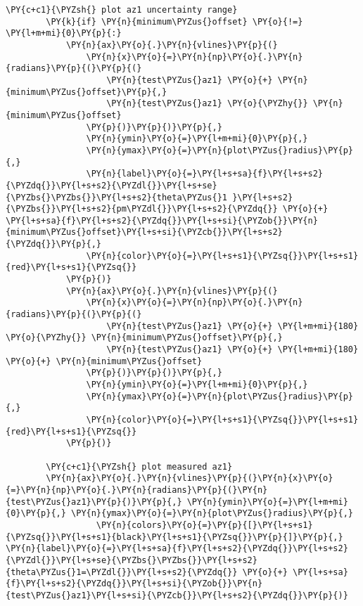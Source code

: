 \begin{tcolorbox}[breakable, size=fbox, boxrule=1pt, pad at break*=1mm,colback=cellbackground, colframe=cellborder]
\begin{Verbatim}[commandchars=\\\{\}]
        \PY{c+c1}{\PYZsh{} plot az1 uncertainty range}
        \PY{k}{if} \PY{n}{minimum\PYZus{}offset} \PY{o}{!=} \PY{l+m+mi}{0}\PY{p}{:}
            \PY{n}{ax}\PY{o}{.}\PY{n}{vlines}\PY{p}{(}
                \PY{n}{x}\PY{o}{=}\PY{n}{np}\PY{o}{.}\PY{n}{radians}\PY{p}{(}\PY{p}{(}
                    \PY{n}{test\PYZus{}az1} \PY{o}{+} \PY{n}{minimum\PYZus{}offset}\PY{p}{,}
                    \PY{n}{test\PYZus{}az1} \PY{o}{\PYZhy{}} \PY{n}{minimum\PYZus{}offset}
                \PY{p}{)}\PY{p}{)}\PY{p}{,}
                \PY{n}{ymin}\PY{o}{=}\PY{l+m+mi}{0}\PY{p}{,}
                \PY{n}{ymax}\PY{o}{=}\PY{n}{plot\PYZus{}radius}\PY{p}{,}
                \PY{n}{label}\PY{o}{=}\PY{l+s+sa}{f}\PY{l+s+s2}{\PYZdq{}}\PY{l+s+s2}{\PYZdl{}}\PY{l+s+se}{\PYZbs{}\PYZbs{}}\PY{l+s+s2}{theta\PYZus{}1 }\PY{l+s+s2}{\PYZbs{}}\PY{l+s+s2}{pm\PYZdl{}}\PY{l+s+s2}{\PYZdq{}} \PY{o}{+} \PY{l+s+sa}{f}\PY{l+s+s2}{\PYZdq{}}\PY{l+s+si}{\PYZob{}}\PY{n}{minimum\PYZus{}offset}\PY{l+s+si}{\PYZcb{}}\PY{l+s+s2}{\PYZdq{}}\PY{p}{,}
                \PY{n}{color}\PY{o}{=}\PY{l+s+s1}{\PYZsq{}}\PY{l+s+s1}{red}\PY{l+s+s1}{\PYZsq{}}
            \PY{p}{)}
            \PY{n}{ax}\PY{o}{.}\PY{n}{vlines}\PY{p}{(}
                \PY{n}{x}\PY{o}{=}\PY{n}{np}\PY{o}{.}\PY{n}{radians}\PY{p}{(}\PY{p}{(}
                    \PY{n}{test\PYZus{}az1} \PY{o}{+} \PY{l+m+mi}{180} \PY{o}{\PYZhy{}} \PY{n}{minimum\PYZus{}offset}\PY{p}{,}
                    \PY{n}{test\PYZus{}az1} \PY{o}{+} \PY{l+m+mi}{180} \PY{o}{+} \PY{n}{minimum\PYZus{}offset}
                \PY{p}{)}\PY{p}{)}\PY{p}{,}
                \PY{n}{ymin}\PY{o}{=}\PY{l+m+mi}{0}\PY{p}{,}
                \PY{n}{ymax}\PY{o}{=}\PY{n}{plot\PYZus{}radius}\PY{p}{,}
                \PY{n}{color}\PY{o}{=}\PY{l+s+s1}{\PYZsq{}}\PY{l+s+s1}{red}\PY{l+s+s1}{\PYZsq{}}
            \PY{p}{)}
    
        \PY{c+c1}{\PYZsh{} plot measured az1}
        \PY{n}{ax}\PY{o}{.}\PY{n}{vlines}\PY{p}{(}\PY{n}{x}\PY{o}{=}\PY{n}{np}\PY{o}{.}\PY{n}{radians}\PY{p}{(}\PY{n}{test\PYZus{}az1}\PY{p}{)}\PY{p}{,} \PY{n}{ymin}\PY{o}{=}\PY{l+m+mi}{0}\PY{p}{,} \PY{n}{ymax}\PY{o}{=}\PY{n}{plot\PYZus{}radius}\PY{p}{,}
                  \PY{n}{colors}\PY{o}{=}\PY{p}{[}\PY{l+s+s1}{\PYZsq{}}\PY{l+s+s1}{black}\PY{l+s+s1}{\PYZsq{}}\PY{p}{]}\PY{p}{,} \PY{n}{label}\PY{o}{=}\PY{l+s+sa}{f}\PY{l+s+s2}{\PYZdq{}}\PY{l+s+s2}{\PYZdl{}}\PY{l+s+se}{\PYZbs{}\PYZbs{}}\PY{l+s+s2}{theta\PYZus{}1=\PYZdl{}}\PY{l+s+s2}{\PYZdq{}} \PY{o}{+} \PY{l+s+sa}{f}\PY{l+s+s2}{\PYZdq{}}\PY{l+s+si}{\PYZob{}}\PY{n}{test\PYZus{}az1}\PY{l+s+si}{\PYZcb{}}\PY{l+s+s2}{\PYZdq{}}\PY{p}{)}
    

\end{Verbatim}
\end{tcolorbox}
